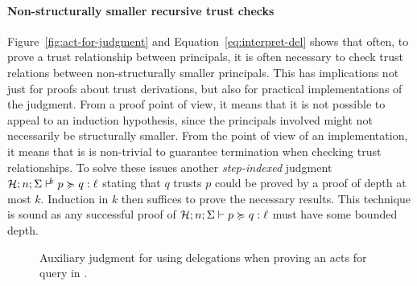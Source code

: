 \paragraph{Non-structurally smaller recursive trust checks}
Figure~\ref{fig:act-for-judgment} and Equation~\eqref{eq:interpret-del} shows that often, to prove a trust relationship between principals, it is often necessary to check trust relations between non-structurally smaller principals. This has implications not just for proofs about trust derivations, but also for practical implementations of the judgment. From a proof point of view, it means that it is not possible to appeal to an induction hypothesis, since the principals involved might not necessarily be structurally smaller. From the point of view of an implementation, it means that is is non-trivial to guarantee termination when checking trust relationships. To solve these issues another \emph{step-indexed} judgment $\actsforquerycount{\Assumps; n; \env}{p}{q}{\level}{k}$ stating that $q$ trusts $p$ could be proved by a proof of depth at most $k$. Induction in $k$ then suffices to prove the necessary results. This technique is sound as any successful proof of $\actsforquery{\Assumps; n; \env}{p}{q}{\level}$ must have some bounded depth.

\begin{figure}
    \centering
    \caption{Auxiliary judgment for using delegations when proving an acts for query in \lang.}
    \label{fig:act-for-judgment-del}
\end{figure}

